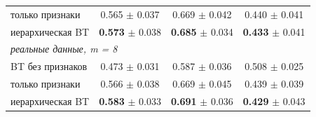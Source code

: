 \begin{tabular}{lccc}
только признаки & 0.565 $\pm$ 0.037 & 0.669 $\pm$ 0.042 & 0.440 $\pm$ 0.041 \\
иерархическая BT & \textbf{0.573} $\pm$ 0.038 & \textbf{0.685} $\pm$ 0.034 & \textbf{0.433} $\pm$ 0.041 \\
\midrule
\multicolumn{4}{l}{\textit{реальные данные, m = 8}} \\
BT без признаков & 0.473 $\pm$ 0.031 & 0.587 $\pm$ 0.036 & 0.508 $\pm$ 0.025 \\
только признаки & 0.566 $\pm$ 0.038 & 0.669 $\pm$ 0.045 & 0.439 $\pm$ 0.039 \\
иерархическая BT & \textbf{0.583} $\pm$ 0.033 & \textbf{0.691} $\pm$ 0.036 & \textbf{0.429} $\pm$ 0.043 \\
\bottomrule
\end{tabular}
